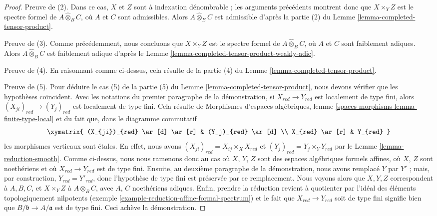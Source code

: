 \begin{proof}
\medskip\noindent
Preuve de (2). Dans ce cas, $X$ et $Z$ sont à indexation dénombrable ;
les arguments précédents montrent donc que $X \times_Y Z$ est le spectre formel
de $A \widehat{\otimes}_B C$, où $A$ et $C$ sont admissibles.
Alors $A \widehat{\otimes}_B C$ est admissible d'après la
partie (2) du Lemme \ref{lemma-completed-tensor-product}.

\medskip\noindent
Preuve de (3). Comme précédemment, nous concluons que $X \times_Y Z$ est le spectre formel
de $A \widehat{\otimes}_B C$, où $A$ et $C$ sont faiblement adiques.
Alors $A \widehat{\otimes}_B C$ est faiblement adique d'après le
Lemme \ref{lemma-completed-tensor-product-weakly-adic}.

\medskip\noindent
Preuve de (4). En raisonnant comme ci-dessus, cela résulte de la
partie (4) du Lemme \ref{lemma-completed-tensor-product}.

\medskip\noindent
Preuve de (5). Pour déduire le cas (5) de la
partie (5) du Lemme \ref{lemma-completed-tensor-product},
nous devons vérifier que les hypothèses coïncident.
Avec les notations du premier paragraphe de la démonstration,
si $X_{red} \to Y_{red}$ est localement de type fini, alors
$(X_{ji})_{red} \to (Y_j)_{red}$ est localement de type fini. Cela résulte de
Morphismes d'espaces algébriques, lemme \ref{spaces-morphisms-lemma-finite-type-local}
et du fait que, dans le diagramme commutatif
$$
\xymatrix{
(X_{ji})_{red} \ar[d] \ar[r] & (Y_j)_{red} \ar[d] \\
X_{red} \ar[r] & Y_{red}
}
$$
les morphismes verticaux sont étales. En effet, nous avons
$(X_{ji})_{red} = X_{ij} \times_X X_{red}$ et
$(Y_j)_{red} = Y_j \times_Y Y_{red}$
par le Lemme \ref{lemma-reduction-smooth}. Comme ci-dessus, nous nous ramenons donc
au cas où $X$, $Y$, $Z$ sont des espaces algébriques formels affines,
où $X$, $Z$ sont noethériens et où $X_{red} \to Y_{red}$ est de type fini.
Ensuite, au deuxième paragraphe de la démonstration, nous avons remplacé $Y$ par $Y'$ ;
mais, par construction, $Y_{red} = Y'_{red}$, donc l'hypothèse de type fini
est préservée par ce remplacement. Nous voyons alors que
$X, Y, Z$ correspondent à $A, B, C$, et $X \times_Y Z$ à
$A \widehat{\otimes}_B C$, avec $A$, $C$ noethériens adiques.
Enfin, prendre la réduction revient à quotienter par
l'idéal des éléments topologiquement nilpotents
(exemple \ref{example-reduction-affine-formal-spectrum})
et le fait que $X_{red} \to Y_{red}$ soit de type fini
signifie bien que $B/\mathfrak b \to A/\mathfrak a$ est de type fini.
Ceci achève la démonstration.
\end{proof}

